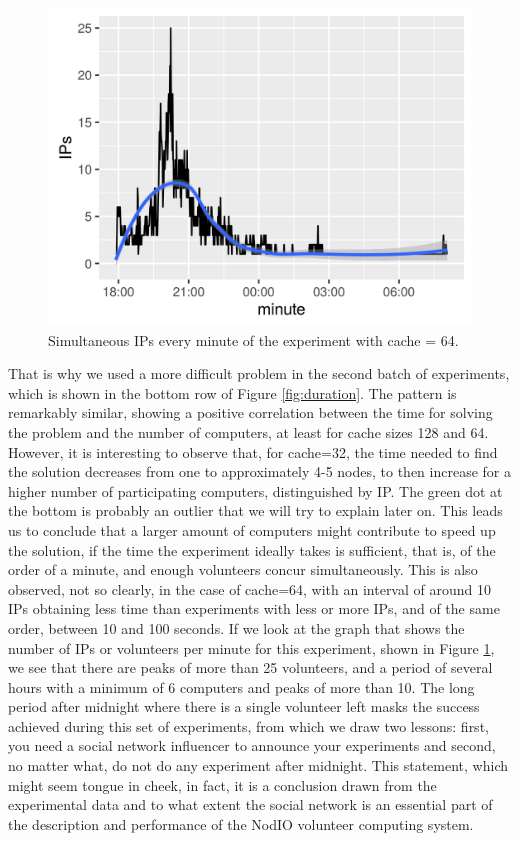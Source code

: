 \documentclass[letterpaper]{article}
\begin{document}
\begin{figure}[!htb]
\centering
\includegraphics[width=0.95\linewidth]{ips-per-minute-cache=64.png}
\caption{Simultaneous IPs every minute of the experiment with cache =
  64. \label{fig:otisdriftwood}}
\end{figure}


That is why we used a more difficult problem in the second batch of
experiments, which is shown in the bottom row of Figure
\ref{fig:duration}. The pattern is remarkably similar, showing a
positive correlation between the time for solving the problem and the
number of computers, at least for cache sizes 128 and 64. However, it
is interesting to observe that, for cache=32, the time needed to find
the solution decreases from one to approximately 4-5 nodes, to then
increase for a higher number of participating computers, distinguished
by IP. The green dot at the bottom is probably an outlier that we
will try to explain later on. This leads us to conclude that a larger
amount of computers might contribute to speed up the solution, if the
time the experiment ideally takes is sufficient, that is, of the order of a
minute, and enough volunteers concur simultaneously. This is also
observed, not so clearly, in the case of cache=64, with an interval of
around 10 IPs obtaining less time than experiments with less or more
IPs, and of the same order, between 10 and 100 seconds. If we look at
the graph that shows the number of IPs or volunteers per minute for
this experiment, shown in Figure \ref{fig:otisdriftwood}, we see that
there are peaks of more than 25 volunteers, and a period of several
hours with a minimum of 6 computers and peaks of more than 10. The
long period after midnight where there is a single volunteer left
masks the success achieved during this set of experiments, from which
we draw two lessons: first, you need a social network influencer to
announce your experiments and second, no matter what, do not do any
experiment after midnight. This statement, which might seem tongue in
cheek, in fact, it is a conclusion drawn from the experimental data and
to what extent the social network is an essential part of the
description and performance of the NodIO volunteer computing system. 
\end{document}
